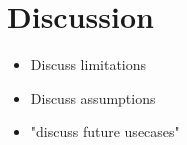 \chapter{Discussion}\label{chp:discussion}
\begin{itemize}
	\item Discuss limitations
	\item Discuss assumptions
	\item "discuss future usecases"
\end{itemize}
